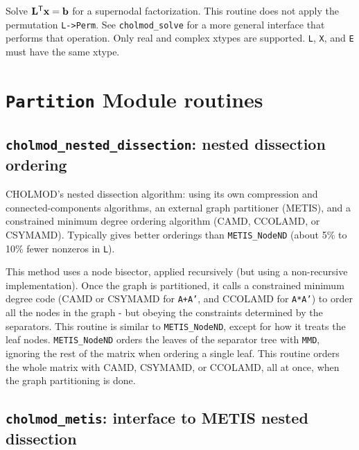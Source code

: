 \documentclass[11pt]{article}
\newcommand{\m}[1]{{\bf{#1}}}       %
\newcommand{\tr}{^{\sf T}}          %
\begin{document}

Solve $\m{L}\tr\m{x}=\m{b}$ for a supernodal factorization.  This routine does not
apply the permutation {\tt L->Perm}.  See {\tt cholmod\_solve} for a more general
interface that performs that operation.
Only real and complex xtypes are supported.
{\tt L}, {\tt X}, and {\tt E} must have the same xtype.

\newpage \section{{\tt Partition} Module routines}

\subsection{{\tt cholmod\_nested\_dissection}: nested dissection ordering}


CHOLMOD's nested dissection algorithm:
	using its own compression and connected-components
	algorithms, an external graph partitioner (METIS), and a constrained
	minimum degree ordering algorithm (CAMD, CCOLAMD, or CSYMAMD).  Typically
	gives better orderings than {\tt METIS\_NodeND} (about 5\% to 10\% fewer
	nonzeros in {\tt L}).

This method uses a node bisector, applied recursively (but using a
non-recursive implementation).  Once the graph is partitioned, it calls a
constrained minimum degree code (CAMD or CSYMAMD for {\tt A+A'},
and CCOLAMD for {\tt A*A'}) to
order all the nodes in the graph - but obeying the constraints determined
by the separators.  This routine is similar to {\tt METIS\_NodeND}, except for
how
it treats the leaf nodes.  {\tt METIS\_NodeND} orders the leaves of the separator
tree with {\tt MMD}, ignoring the rest of the matrix when ordering a single leaf.
This routine orders the whole matrix with CAMD, CSYMAMD, or CCOLAMD, all at once,
when the graph partitioning is done.

\newpage \subsection{{\tt cholmod\_metis}: interface to METIS nested dissection}
\end{document}
